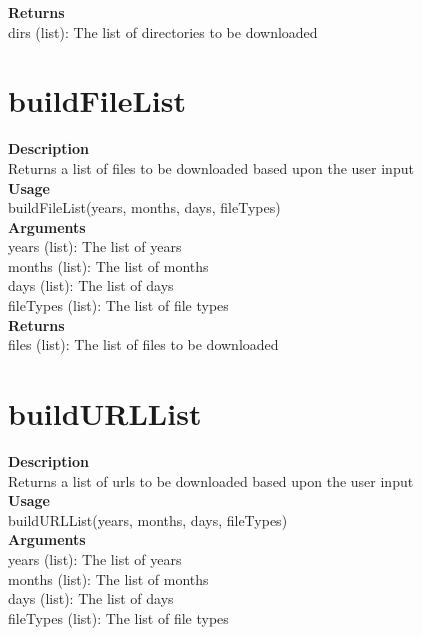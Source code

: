 \documentclass[11pt, oneside]{article}
\begin{document}
\noindent\textbf{Returns} \\
        dirs (list): The list of directories to be downloaded\\


\section{buildFileList}

\textbf{Description} \\
        Returns a list of files to be downloaded based upon the user input\\

\noindent\textbf{Usage} \\
        buildFileList(years, months, days, fileTypes) \\

\noindent\textbf{Arguments} \\
        years (list): The list of years\\
        months (list): The list of months\\
        days (list): The list of days\\
        fileTypes (list): The list of file types\\

\noindent\textbf{Returns} \\
        files (list): The list of files to be downloaded\\

\newpage

\section{buildURLList}

\textbf{Description} \\
        Returns a list of urls to be downloaded based upon the user input\\

\noindent\textbf{Usage} \\
        buildURLList(years, months, days, fileTypes) \\

\noindent\textbf{Arguments} \\
        years (list): The list of years\\
        months (list): The list of months\\
        days (list): The list of days\\
        fileTypes (list): The list of file types\\
\end{document}
